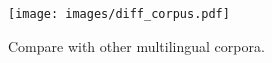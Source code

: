 \begin{figure}[!thb]
    \centering
    \texttt{[image: images/diff\_corpus.pdf]}
    \vspace{-1.5em}
    \caption{\label{fig:diff_corpus}
    Compare \dcad with other multilingual corpora.
    }
    \vspace{-1em}
\end{figure}
